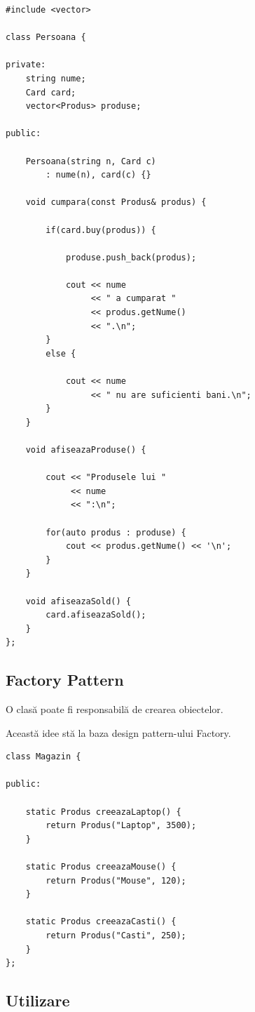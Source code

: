 \documentclass[12pt,a4paper]{article}
\begin{document}
\begin{lstlisting}
#include <vector>

class Persoana {

private:
    string nume;
    Card card;
    vector<Produs> produse;

public:

    Persoana(string n, Card c)
        : nume(n), card(c) {}

    void cumpara(const Produs& produs) {

        if(card.buy(produs)) {

            produse.push_back(produs);

            cout << nume
                 << " a cumparat "
                 << produs.getNume()
                 << ".\n";
        }
        else {

            cout << nume
                 << " nu are suficienti bani.\n";
        }
    }

    void afiseazaProduse() {

        cout << "Produsele lui "
             << nume
             << ":\n";

        for(auto produs : produse) {
            cout << produs.getNume() << '\n';
        }
    }

    void afiseazaSold() {
        card.afiseazaSold();
    }
};
\end{lstlisting}

\subsection{Factory Pattern}

O clasă poate fi responsabilă de crearea obiectelor.

Această idee stă la baza design pattern-ului Factory.

\begin{lstlisting}
class Magazin {

public:

    static Produs creeazaLaptop() {
        return Produs("Laptop", 3500);
    }

    static Produs creeazaMouse() {
        return Produs("Mouse", 120);
    }

    static Produs creeazaCasti() {
        return Produs("Casti", 250);
    }
};
\end{lstlisting}

\subsection{Utilizare}
\end{document}
